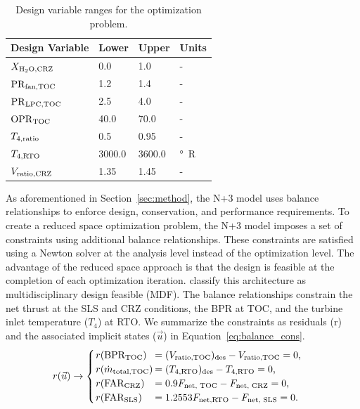 \documentclass[conf]{new-aiaa}
\begin{document}
\begin{table}[hbt!]
  \centering
  \caption{Design variable ranges for the optimization problem.
  }
  \small
  \renewcommand{\arraystretch}{1.2}
  \begin{tabular}{l l l l}
    Design Variable          & Lower  & Upper  & Units          \\
    \toprule
    $X_{\rm{H_2O,CRZ}}$      & 0.0    & 1.0    & -              \\
    $\rm{PR}_{\rm{fan,TOC}}$ & 1.2    & 1.4    & -              \\
    $\rm{PR}_{\rm{LPC,TOC}}$ & 2.5    & 4.0    & -              \\
    $\rm{OPR}_{\rm{TOC}}$    & 40.0   & 70.0   & -              \\
    $T_{4,\rm{ratio}}$       & 0.5    & 0.95   & -              \\
    $T_{4,\rm{RTO}}$         & 3000.0 & 3600.0 & \si{\degree R} \\
    $V_{\rm{ratio,CRZ}}$     & 1.35   & 1.45   & -              \\
    \bottomrule
  \end{tabular}
  \label{tab:dv_table}
\end{table}

As aforementioned in Section~\ref{sec:method}, the N+3 model uses balance relationships to enforce design, conservation, and performance requirements.
To create a reduced space optimization problem, the N+3 model imposes a set of constraints using additional balance relationships.
These constraints are satisfied using a Newton solver at the analysis level instead of the optimization level.
The advantage of the reduced space approach is that the design is feasible at the completion of each optimization iteration.
\citet{Martins2013} classify this architecture as multidisciplinary design feasible (MDF).
The balance relationships constrain the net thrust at the SLS and CRZ conditions, the BPR at TOC, and the turbine inlet temperature ($T_4$) at RTO.
We summarize the constraints as residuals (r) and the associated implicit states ($\vec{u}$) in Equation~\eqref{eq:balance_cons}.
\begin{equation}
  \label{eq:balance_cons}
  r(\vec{u}) \rightarrow
  \begin{cases}
    \setlength{\tabcolsep}{1pt}
    \begin{tabular}{l l}
      $r(\text{BPR}_\text{TOC})$    & $= (V_\text{ratio,TOC})_\text{des} - V_\text{ratio,TOC} = 0$, \\
      $r(\dot{m}_\text{total,TOC})$ & $= (T_{4,\text{RTO}})_\text{des} - T_{4,\text{RTO}} = 0$,     \\
      $r(\text{FAR}_\text{CRZ})$    & $= 0.9 F_\text{net, TOC} - F_\text{net, CRZ} = 0$,            \\
      $r(\text{FAR}_\text{SLS})$    & $= 1.2553 F_\text{net,RTO} - F_\text{net, SLS} = 0$.          \\
    \end{tabular}
  \end{cases}
\end{equation}
\end{document}
